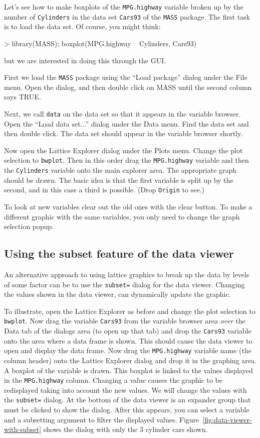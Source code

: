 \documentclass[12pt]{article}
\newcommand{\RCode}[1]{\texttt{#1}}
\begin{document}
Let's see how to make boxplots of the \RCode{MPG.highway} variable
broken up by the number of \RCode{Cylinders} in the data set
\RCode{Cars93} of the \RCode{MASS} package. The first task is to load
the data set. Of course, you might think:
\begin{Soutput}
> library(MASS); boxplot(MPG.highway ~ Cylinders, Cars93)
\end{Soutput}
but we are interested in doing this through the GUI.

First we load the \RCode{MASS} package using the ``Load package''
dialog under the File menu. Open the dialog, and then double click on
MASS until the second column says TRUE.

Next, we call \RCode{data} on the data set so that it appears in the
variable browser. Open the ``Load data set...'' dialog under the Data
menu. Find the data set and then double click. The data set should
appear in the variable browser shortly.

Now open the Lattice Explorer dialog under the Plots menu. Change the
plot selection to \RCode{bwplot}. Then in this order drag the
\RCode{MPG.highway} variable and then the \RCode{Cylinders} variable
onto the main explorer area. The appropriate graph should be
drawn. The basic idea is that the first variable is split up by the
second, and in this case a third is possible. (Drop \RCode{Origin} to
see.)

To look at new variables clear out the old ones with the clear
button. To make a different graphic with the same variables, you only
need to change the graph selection popup.


\subsection{Using the subset feature of the data viewer}

An alternative approach to using lattice graphics to break up the data
by levels of some factor can be to use the \RCode{subset=} dialog for
the data viewer. Changing the values shown in the data viewer, can
dynamically update the graphic. 

To illustrate, open the Lattice Explorer as before and change the plot
selection to \RCode{bwplot}. Now drag the variable \RCode{Cars93} from
the variable browser area \textit{over} the Data tab of the dialogs
area (to open up that tab) and drop the \RCode{Cars93} variable onto
the area where a data frame is shown. This should cause the data
viewer to open and display the data frame. Now drag the
\RCode{MPG.highway} variable name (the column header) onto the Lattice
Explorer dialog and drop it in the graphing area. A boxplot of the
variable is drawn. This boxplot is linked to the values displayed in
the \RCode{MPG.highway} column. Changing a value causes the graphic to
be redisplayed taking into account the new values. We will change the
values with the \RCode{subset=} dialog. At the bottom of the data
viewer is an expander group that must be clicked to show the dialog.
After this appears, you can select a variable and a subsetting
argument to filter the displayed values.
Figure~\ref{fig:data-viewer-with-subset} shows the dialog with only
the 3 cylinder cars shown.
\end{document}
